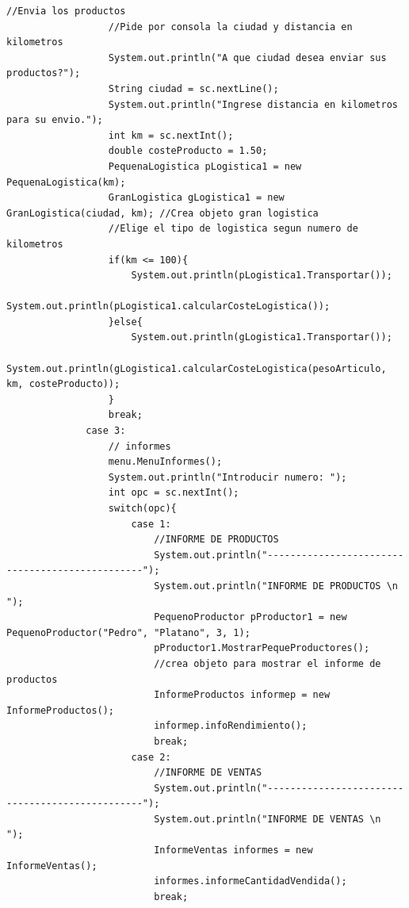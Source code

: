 \documentclass[10pt,a4paper]{article}
\begin{document}
\begin{lstlisting}[style=Java]
                  //Envia los productos 
                  //Pide por consola la ciudad y distancia en kilometros
                  System.out.println("A que ciudad desea enviar sus productos?");
                  String ciudad = sc.nextLine();
                  System.out.println("Ingrese distancia en kilometros para su envio.");
                  int km = sc.nextInt();
                  double costeProducto = 1.50;
                  PequenaLogistica pLogistica1 = new PequenaLogistica(km);
                  GranLogistica gLogistica1 = new GranLogistica(ciudad, km); //Crea objeto gran logistica
                  //Elige el tipo de logistica segun numero de kilometros
                  if(km <= 100){
                      System.out.println(pLogistica1.Transportar());
                      System.out.println(pLogistica1.calcularCosteLogistica());
                  }else{
                      System.out.println(gLogistica1.Transportar());
                      System.out.println(gLogistica1.calcularCosteLogistica(pesoArticulo, km, costeProducto));
                  }   
                  break;
              case 3:
                  // informes
                  menu.MenuInformes();
                  System.out.println("Introducir numero: ");
                  int opc = sc.nextInt();
                  switch(opc){
                      case 1:
                          //INFORME DE PRODUCTOS
                          System.out.println("------------------------------------------------");
                          System.out.println("INFORME DE PRODUCTOS \n     ");
                          PequenoProductor pProductor1 = new PequenoProductor("Pedro", "Platano", 3, 1);
                          pProductor1.MostrarPequeProductores();
                          //crea objeto para mostrar el informe de productos
                          InformeProductos informep = new InformeProductos();
                          informep.infoRendimiento();
                          break;
                      case 2:
                          //INFORME DE VENTAS
                          System.out.println("------------------------------------------------");
                          System.out.println("INFORME DE VENTAS \n     ");
                          InformeVentas informes = new InformeVentas();
                          informes.informeCantidadVendida();
                          break;
                          

\end{lstlisting}
\end{document}
